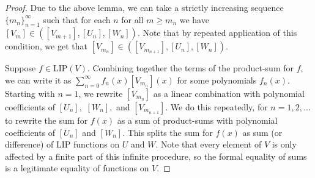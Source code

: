 \documentclass[10pt,a4paper]{amsart}
\begin{document}
\begin{proof}
Due to the above lemma, we can take a strictly increasing sequence  $\{m_n\}_{n=1}^{\infty}$ such that for each $n$ for all $m\geq m_n$ we have $[V_m]\in ([V_{m+1}],[U_n], [W_n])$. Note that by repeated application of this condition, we get that $[V_{m_n}]\in ([V_{m_{n+1}}],[U_n], [W_n]).$


Suppose $f\in \textrm{LIP} (V).$ Combining together the terms of  the product-sum for $f$, we can write it as $\sum_{n=0}^{\infty} f_n(x) [V_{m_n}](x)$ for some polynomials $f_n(x).$ 
Starting with $n=1$, we rewrite $[V_{m_n}]$ as a linear combination with polynomial coefficients of  $[U_n],$ $[W_n],$ and $[V_{m_{n+1}}]$. We do this repeatedly, for $n=1,2,\dots$ to rewrite the sum for $f(x)$ as a sum of product-sums with polynomial coefficients of $[U_n]$ and $[W_n].$ This splits the sum for $f(x)$ as sum (or difference) of LIP functions on $U$ and $W.$ Note that every element of $V$ is only affected by a finite part of this infinite procedure, so the formal equality of sums is a legitimate equality of functions on $V.$
\end{proof}
\end{document}
